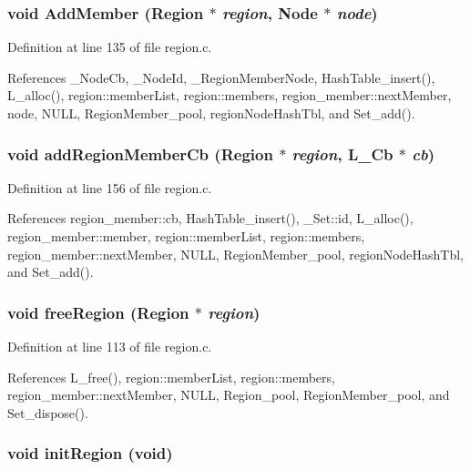 \subsubsection{\setlength{\rightskip}{0pt plus 5cm}void Add\-Member (\bf{Region} $\ast$ {\em region}, \bf{Node} $\ast$ {\em node})}\label{region_8c_cddadead93362fe953336a0747798580}




Definition at line 135 of file region.c.

References \_\-Node\-Cb, \_\-Node\-Id, \_\-Region\-Member\-Node, Hash\-Table\_\-insert(), L\_\-alloc(), region::member\-List, region::members, region\_\-member::next\-Member, node, NULL, Region\-Member\_\-pool, region\-Node\-Hash\-Tbl, and Set\_\-add().
\subsubsection{\setlength{\rightskip}{0pt plus 5cm}void add\-Region\-Member\-Cb (\bf{Region} $\ast$ {\em region}, L\_\-Cb $\ast$ {\em cb})}\label{region_8c_7018bfc607ccd72b309651e5b7931c7b}




Definition at line 156 of file region.c.

References region\_\-member::cb, Hash\-Table\_\-insert(), \_\-Set::id, L\_\-alloc(), region\_\-member::member, region::member\-List, region::members, region\_\-member::next\-Member, NULL, Region\-Member\_\-pool, region\-Node\-Hash\-Tbl, and Set\_\-add().
\subsubsection{\setlength{\rightskip}{0pt plus 5cm}void free\-Region (\bf{Region} $\ast$ {\em region})}\label{region_8c_b24dd54edc0ca358ddef994d6d2a4bbc}




Definition at line 113 of file region.c.

References L\_\-free(), region::member\-List, region::members, region\_\-member::next\-Member, NULL, Region\_\-pool, Region\-Member\_\-pool, and Set\_\-dispose().
\subsubsection{\setlength{\rightskip}{0pt plus 5cm}void init\-Region (void)}\label{region_8c_06133a96de8199c1f9ad53f81b9ccefb}




